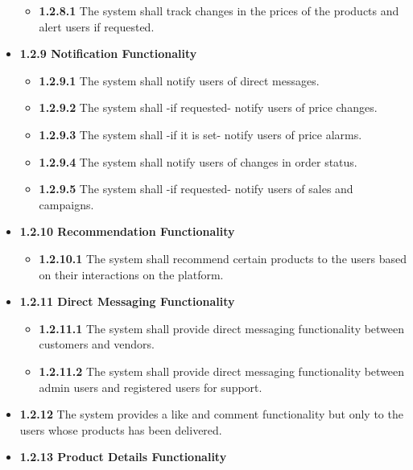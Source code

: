 \documentclass[]{article}
\providecommand{\tightlist}{%
  \setlength{\itemsep}{0pt}\setlength{\parskip}{0pt}}
\begin{document}
\begin{itemize}
          \begin{itemize}
              \tightlist
              \item
                    \textbf{1.2.8.1} The system shall track changes in the prices of the
                    products and alert users if requested.
          \end{itemize}
    \item
          \textbf{1.2.9 Notification Functionality}

          \begin{itemize}
              \tightlist
              \item
                    \textbf{1.2.9.1} The system shall notify users of direct messages.
              \item
                    \textbf{1.2.9.2} The system shall -if requested- notify users of
                    price changes.
              \item
                    \textbf{1.2.9.3} The system shall -if it is set- notify users of
                    price alarms.
              \item
                    \textbf{1.2.9.4} The system shall notify users of changes in order
                    status.
              \item
                    \textbf{1.2.9.5} The system shall -if requested- notify users of
                    sales and campaigns.
          \end{itemize}
    \item
          \textbf{1.2.10 Recommendation Functionality}

          \begin{itemize}
              \tightlist
              \item
                    \textbf{1.2.10.1} The system shall recommend certain products to the
                    users based on their interactions on the platform.
          \end{itemize}
    \item
          \textbf{1.2.11 Direct Messaging Functionality}

          \begin{itemize}
              \tightlist
              \item
                    \textbf{1.2.11.1} The system shall provide direct messaging
                    functionality between customers and vendors.
              \item
                    \textbf{1.2.11.2} The system shall provide direct messaging
                    functionality between admin users and registered users for support.
          \end{itemize}
    \item
          \textbf{1.2.12} The system provides a like and comment functionality
          but only to the users whose products has been delivered.
    \item
          \textbf{1.2.13 Product Details Functionality}


\end{itemize}
\end{document}
